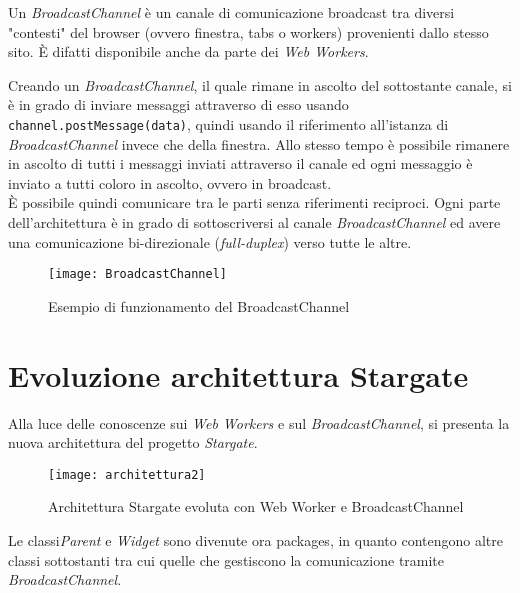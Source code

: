 Un \textit{BroadcastChannel} è un canale di comunicazione broadcast tra diversi "contesti" del browser (ovvero finestra, tabs o workers) provenienti dallo stesso sito. È difatti disponibile anche da parte dei \textit{Web Workers}.

Creando un \textit{BroadcastChannel}, il quale rimane in ascolto del sottostante canale, si è in grado di inviare messaggi attraverso di esso usando \texttt{channel.postMessage(data)}, quindi usando il riferimento all'istanza di \textit{BroadcastChannel} invece che della finestra. Allo stesso tempo è possibile rimanere in ascolto di tutti i messaggi inviati attraverso il canale ed ogni messaggio è inviato a tutti coloro in ascolto, ovvero in broadcast. \\

È possibile quindi comunicare tra le parti senza riferimenti reciproci. Ogni parte dell'architettura è in grado di sottoscriversi al canale \textit{BroadcastChannel} ed avere una comunicazione bi-direzionale (\textit{full-duplex}) verso tutte le altre.

\begin{figure}[H] 
  \centering 
  \texttt{[image: BroadcastChannel]} 
  \caption{Esempio di funzionamento del BroadcastChannel}
\end{figure}

\section{Evoluzione architettura Stargate}

Alla luce delle conoscenze sui \textit{Web Workers} e sul \textit{BroadcastChannel}, si presenta la nuova architettura del progetto \textit{Stargate}.

\begin{figure}[H] 
  \centering 
  \texttt{[image: architettura2]} 
  \caption{Architettura Stargate evoluta con Web Worker e BroadcastChannel}
\end{figure}

Le classi\textit{Parent} e \textit{Widget} sono divenute ora packages, in quanto contengono altre classi sottostanti tra cui quelle che gestiscono la comunicazione tramite \textit{BroadcastChannel}. \\

